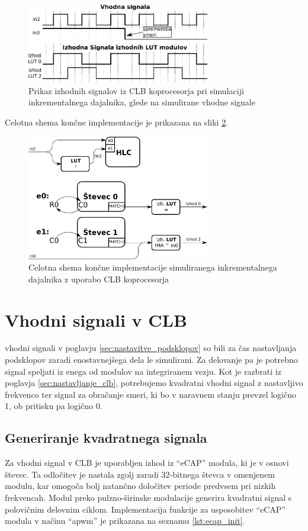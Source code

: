 \documentclass[a4paper]{article}
\begin{document}
\begin{sloppypar}
\begin{figure}[htb]
    \centerline{\includegraphics[width=8cm]{obracanje_smeri_potek}}
    \caption{Prikaz izhodnih signalov iz CLB koprocesorja pri simulaciji 
             inkrementalnega dajalnika, glede na simulirane vhodne signale}
    \label{fig:obracanje_smeri}
\end{figure}

Celotna shema končne implementacije je prikazana na sliki
\ref{fig:koncna_shema}.

\begin{figure}[htb]
    \centerline{\includegraphics[width=8cm]{koncna_shema}}
    \caption{Celotna shema končne implementacije simuliranega inkrementalnega
             dajalnika z uporabo CLB koprocesorja}
    \label{fig:koncna_shema}
\end{figure}

\section{Vhodni signali v CLB}
vhodni signali v poglavju \ref{sec:nastavitve_podsklopov} so bili za čas
nastavljanja podsklopov zaradi enostavnejšega dela le simulirani. Za delovanje
pa je potrebno signal speljati iz enega od modulov na integriranem vezju. Kot
je razbrati iz poglavja \ref{sec:nastavljanje_clb}, potrebujemo kvadratni
vhodni signal z nastavljivo frekvenco ter signal za obračanje smeri, ki bo v
naravnem stanju prevzel logično 1, ob pritisku pa logično 0.


\subsection{Generiranje kvadratnega signala}
Za vhodni signal v CLB je uporabljen izhod iz ``eCAP'' modula, ki je v osnovi
števec. Ta odločitev je nastala zgolj zaradi 32-bitnega števca v omenjenem
modulu, kar omogoča bolj natančno določitev periode predvsem pri nizkih
frekvencah. Modul preko pulzno-širinske modulacije generira kvadratni signal s
polovičnim delovnim ciklom. Implementacija funkcije za usposobitev ``eCAP''
modula v načinu ``apwm'' je prikazana na seznamu \ref{lst:ecap_init}.


\end{sloppypar}
\end{document}
